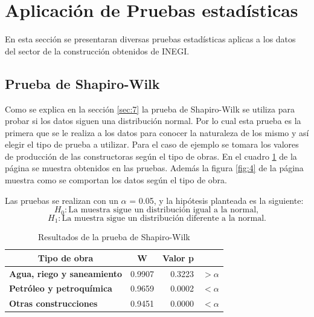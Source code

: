 \documentclass{article}
\begin{document}
\section{Aplicación de Pruebas estadísticas}

En esta sección se presentaran diversas pruebas estadísticas aplicas a los datos del sector de la construcción obtenidos de INEGI.

\subsection{Prueba de Shapiro-Wilk}
\label{sec:9}
Como se explica en la sección \ref{sec:7} la prueba de Shapiro-Wilk se utiliza para probar si los datos siguen una distribución normal. Por lo cual esta prueba es la primera que se le realiza a los datos para conocer la naturaleza de los mismo y así elegir el tipo de prueba a utilizar. Para el caso de ejemplo se tomara los valores de producción de las constructoras según el tipo de obras. En el cuadro \ref{tab:6} de la página \pageref{tab:6} se muestra obtenidos en las pruebas. Además la figura \ref{fig:4} de la página \pageref{fig:4} muestra como se comportan los datos según el tipo de obra.  

Las pruebas se realizan con un $\alpha$ = 0.05, y la hipótesis planteada es la siguiente: 
\begin{equation}\label{eq:1}
H_{0}:\text{La muestra sigue un distribución igual a la normal},    
\end{equation}
\begin{equation}\label{eq:2}
 H_{1}:\text{La muestra sigue un distribución diferente a la normal}. 
\end{equation}


\begin{table}
  \centering
  \caption{Resultados de la prueba de Shapiro-Wilk}
    \begin{tabular}{lrrl}
    \toprule
    \multicolumn{1}{c}{\textbf{Tipo de obra}} & \multicolumn{1}{c}{\textbf{W}} & \multicolumn{1}{c}{\textbf{Valor p}} &  \\
    \midrule
    \textbf{Agua, riego y saneamiento} & 0.9907 & 0.3223 &        $>\alpha$  \\
    \textbf{Petróleo y petroquímica} & 0.9659 & 0.0002 &      $<\alpha$ \\
    \textbf{Otras construcciones} & 0.9451 & 0.0000 &       $<\alpha$ \\
    \bottomrule
    \end{tabular}%
  \label{tab:6}%
\end{table}%
\end{document}
